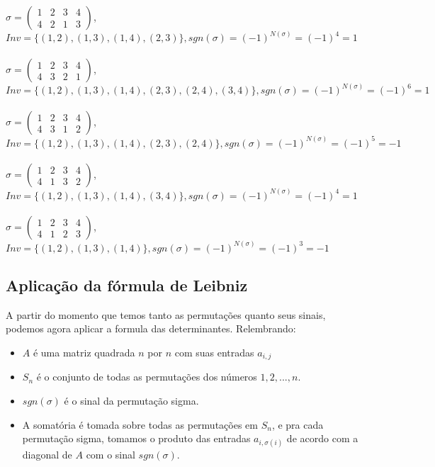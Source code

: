 \documentclass[12pt, a4paper]{article}
\begin{document}
\noindent
$\sigma =\left(\begin{array}{cccc} 1 & 2 & 3 & 4\\ 4 & 2 & 1 & 3 \end{array}\right)$,\\  $Inv = \{(1, 2), (1, 3), (1, 4), (2, 3)\}, sgn(\sigma) = (-1)^{N(\sigma)} = (-1)^4 = 1$\\
\\
\noindent
$\sigma =\left(\begin{array}{cccc} 1 & 2 & 3 & 4\\ 4 & 3 & 2 & 1 \end{array}\right)$,\\  $Inv = \{(1, 2), (1, 3), (1, 4), (2, 3), (2, 4), (3, 4)\}, sgn(\sigma) = (-1)^{N(\sigma)} = (-1)^6 = 1$\\
\\
\noindent
$\sigma =\left(\begin{array}{cccc} 1 & 2 & 3 & 4\\ 4 & 3 & 1 & 2 \end{array}\right)$,\\  $Inv = \{(1, 2), (1, 3), (1, 4), (2, 3), (2, 4)\}, sgn(\sigma) = (-1)^{N(\sigma)} = (-1)^5 = -1$\\
\\
\noindent
$\sigma =\left(\begin{array}{cccc} 1 & 2 & 3 & 4\\ 4 & 1 & 3 & 2 \end{array}\right)$,\\  $Inv = \{(1, 2), (1, 3), (1, 4), (3, 4)\}, sgn(\sigma) = (-1)^{N(\sigma)} = (-1)^4 = 1$\\
\\
\noindent
$\sigma =\left(\begin{array}{cccc} 1 & 2 & 3 & 4\\ 4 & 1 & 2 & 3 \end{array}\right)$,\\  $Inv = \{(1, 2), (1, 3), (1, 4)\}, sgn(\sigma) = (-1)^{N(\sigma)} = (-1)^3 = -1$\\

\subsection{Aplicação da fórmula de Leibniz}
A partir do momento que temos tanto as permutações quanto seus sinais, podemos agora aplicar a formula das determinantes.
Relembrando:
\begin{itemize}

\item $A$ é uma matriz quadrada $n$ por $n$ com suas entradas $a_{i,j}$ 
\item $S_n$ é o conjunto de todas as permutações dos números $1, 2, ..., n.$ \item$sgn(\sigma)$ é o sinal da permutação sigma.
\item A somatória é tomada sobre todas as permutações em $S_n$,  e pra cada permutação sigma, tomamos o produto das entradas $a_{i,\sigma(i)}$ de acordo com a diagonal de $A$ com o sinal  $sgn(\sigma)$.
\end{itemize}
\end{document}
